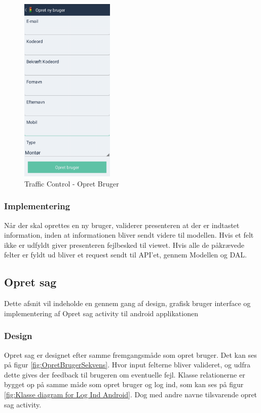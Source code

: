 	\begin{figure}[!ht]
		\begin{center}
			\includegraphics[height=9cm]{Android/Billeder/AndroidOpretbruger}
		\end{center}
		\caption{Traffic Control - Opret Bruger}
		\label{fig: Traffic Control - Opret Bruger}
	\end{figure}
	 	
	\subsubsection{Implementering}
	Når der skal oprettes en ny bruger, validerer presenteren at der er indtastet information, inden at informationen bliver sendt videre til modellen. Hvis et felt ikke er udfyldt giver presenteren fejlbesked til viewet. Hvis alle de påkrævede felter er fyldt ud bliver et request sendt til API'et, gennem Modellen og DAL.	
	\pagebreak
	
	
	\subsection{Opret sag}
	Dette afsnit vil indeholde en gennem gang af design, grafisk bruger interface og implementering af Opret sag activity til android applikationen
	\subsubsection{Design}
	Opret sag er designet efter samme fremgangsmåde som opret bruger. Det kan ses på figur \ref{fig:OpretBrugerSekvens}. Hvor input felterne bliver valideret, og udfra dette gives der feedback til brugeren om eventuelle fejl. 
	Klasse relationerne er bygget op på samme måde som opret bruger og log ind, som kan ses på figur \ref{fig:Klasse diagram for Log Ind Android}.
	Dog med andre navne tilsvarende opret sag activity.
	
